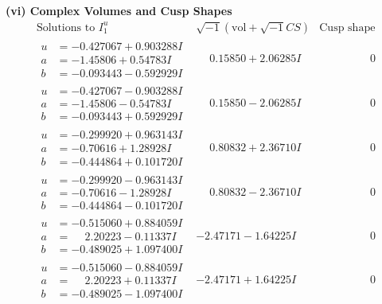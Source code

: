 \documentclass[1p]{elsarticle_modified}
\theoremstyle{definition}
\newcommand{\I}{\sqrt{-1}}
\begin{document}
\newpage\flushleft \textbf{(vi) Complex Volumes and Cusp Shapes}
$$\begin{array}{c|c|c}  
\text{Solutions to }I^u_{1}& \I (\text{vol} + \sqrt{-1}CS) & \text{Cusp shape}\\
 \hline 
\begin{aligned}
u &= -0.427067 + 0.903288 I \\
a &= -1.45806 + 0.54783 I \\
b &= -0.093443 - 0.592929 I\end{aligned}
 & \phantom{-}0.15850 + 2.06285 I & \phantom{-0.000000 } 0 \\ \hline\begin{aligned}
u &= -0.427067 - 0.903288 I \\
a &= -1.45806 - 0.54783 I \\
b &= -0.093443 + 0.592929 I\end{aligned}
 & \phantom{-}0.15850 - 2.06285 I & \phantom{-0.000000 } 0 \\ \hline\begin{aligned}
u &= -0.299920 + 0.963143 I \\
a &= -0.70616 + 1.28928 I \\
b &= -0.444864 + 0.101720 I\end{aligned}
 & \phantom{-}0.80832 + 2.36710 I & \phantom{-0.000000 } 0 \\ \hline\begin{aligned}
u &= -0.299920 - 0.963143 I \\
a &= -0.70616 - 1.28928 I \\
b &= -0.444864 - 0.101720 I\end{aligned}
 & \phantom{-}0.80832 - 2.36710 I & \phantom{-0.000000 } 0 \\ \hline\begin{aligned}
u &= -0.515060 + 0.884059 I \\
a &= \phantom{-}2.20223 - 0.11337 I \\
b &= -0.489025 + 1.097400 I\end{aligned}
 & -2.47171 - 1.64225 I & \phantom{-0.000000 } 0 \\ \hline\begin{aligned}
u &= -0.515060 - 0.884059 I \\
a &= \phantom{-}2.20223 + 0.11337 I \\
b &= -0.489025 - 1.097400 I\end{aligned}
 & -2.47171 + 1.64225 I & \phantom{-0.000000 } 0 \\ \hline\begin{aligned}

\end{aligned}
\end{array}$$
\end{document}
